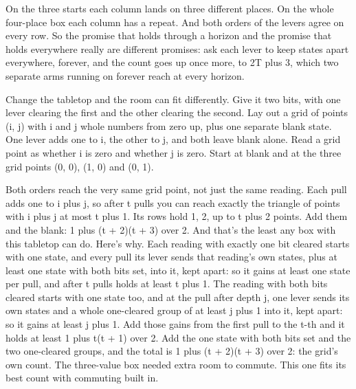 \documentclass[11pt,twoside]{article}
\theoremstyle{thielethm}
\theoremstyle{thieledef}
\theoremstyle{thieledef}
\theoremstyle{thieledef}
\theoremstyle{thielethm}
\theoremstyle{thieleobs}
\theoremstyle{thielethm}
\begin{document}
On the three starts each column lands on three different places. On the whole four-place box each column has a repeat. And both orders of the levers agree on every row. So the promise that holds through a horizon and the promise that holds everywhere really are different promises: ask each lever to keep states apart everywhere, forever, and the count goes up once more, to 2T plus 3, which two separate arms running on forever reach at every horizon.

Change the tabletop and the room can fit differently. Give it two bits, with one lever clearing the first and the other clearing the second. Lay out a grid of points (i, j) with i and j whole numbers from zero up, plus one separate blank state. One lever adds one to i, the other to j, and both leave blank alone. Read a grid point as whether i is zero and whether j is zero. Start at blank and at the three grid points (0, 0), (1, 0) and (0, 1).

\begin{center}
\end{center}

Both orders reach the very same grid point, not just the same reading. Each pull adds one to i plus j, so after t pulls you can reach exactly the triangle of points with i plus j at most t plus 1. Its rows hold 1, 2, up to t plus 2 points. Add them and the blank: 1 plus (t + 2)(t + 3) over 2. And that's the least any box with this tabletop can do. Here's why. Each reading with exactly one bit cleared starts with one state, and every pull its lever sends that reading's own states, plus at least one state with both bits set, into it, kept apart: so it gains at least one state per pull, and after t pulls holds at least t plus 1. The reading with both bits cleared starts with one state too, and at the pull after depth j, one lever sends its own states and a whole one-cleared group of at least j plus 1 into it, kept apart: so it gains at least j plus 1. Add those gains from the first pull to the t-th and it holds at least 1 plus t(t + 1) over 2. Add the one state with both bits set and the two one-cleared groups, and the total is 1 plus (t + 2)(t + 3) over 2: the grid's own count. The three-value box needed extra room to commute. This one fits its best count with commuting built in.
\end{document}
